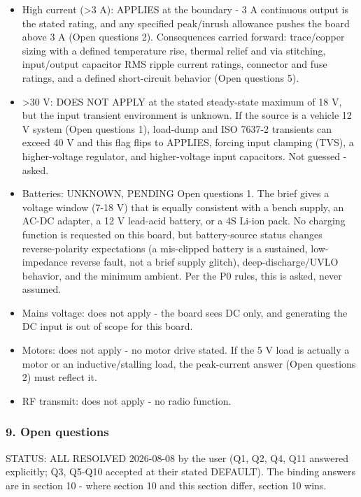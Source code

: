 \documentclass[11pt,a4paper]{article}
\begin{document}
\begin{itemize}
\item High current (\textgreater{}3 A): APPLIES at the boundary - 3 A continuous output is
the stated rating, and any specified peak/inrush allowance pushes the
board above 3 A (Open questions 2). Consequences carried forward:
trace/copper sizing with a defined temperature rise, thermal relief and
via stitching, input/output capacitor RMS ripple current ratings,
connector and fuse ratings, and a defined short-circuit behavior
(Open questions 5).
\item \textgreater{}30 V: DOES NOT APPLY at the stated steady-state maximum of 18 V, but
the input transient environment is unknown. If the source is a vehicle
12 V system (Open questions 1), load-dump and ISO 7637-2 transients can
exceed 40 V and this flag flips to APPLIES, forcing input clamping
(TVS), a higher-voltage regulator, and higher-voltage input capacitors.
Not guessed - asked.
\item Batteries: UNKNOWN, PENDING Open questions 1. The brief gives a voltage
window (7-18 V) that is equally consistent with a bench supply, an
AC-DC adapter, a 12 V lead-acid battery, or a 4S Li-ion pack. No
charging function is requested on this board, but battery-source status
changes reverse-polarity expectations (a mis-clipped battery is a
sustained, low-impedance reverse fault, not a brief supply glitch),
deep-discharge/UVLO behavior, and the minimum ambient. Per the P0
rules, this is asked, never assumed.
\item Mains voltage: does not apply - the board sees DC only, and generating
the DC input is out of scope for this board.
\item Motors: does not apply - no motor drive stated. If the 5 V load is
actually a motor or an inductive/stalling load, the peak-current answer
(Open questions 2) must reflect it.
\item RF transmit: does not apply - no radio function.
\end{itemize}
\subsubsection*{9. Open questions}
STATUS: ALL RESOLVED 2026-08-08 by the user (Q1, Q2, Q4, Q11 answered explicitly; Q3, Q5-Q10 accepted at their stated DEFAULT). The binding answers are in section 10 - where section 10 and this section differ, section 10 wins.
\end{document}
